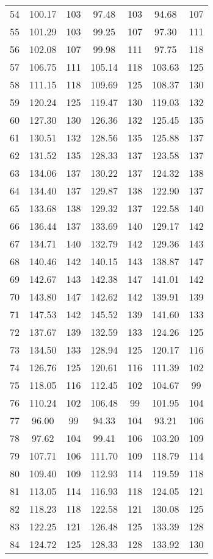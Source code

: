 \begin{center}
\begin{longtable}{lcccccc}
    54 &100.17&103& 97.48&103& 94.68&107 \\
    55 &101.29&103& 99.25&107& 97.30&111 \\
    56 &102.08&107& 99.98&111& 97.75&118 \\
    57 &106.75&111&105.14&118&103.63&125 \\
    58 &111.15&118&109.69&125&108.37&130 \\
    59 &120.24&125&119.47&130&119.03&132 \\
    60 &127.30&130&126.36&132&125.45&135 \\
    61 &130.51&132&128.56&135&125.88&137 \\
    62 &131.52&135&128.33&137&123.58&137 \\
    63 &134.06&137&130.22&137&124.32&138 \\
    64 &134.40&137&129.87&138&122.90&137 \\
    65 &133.68&138&129.32&137&122.58&140 \\
    66 &136.44&137&133.69&140&129.17&142 \\
    67 &134.71&140&132.79&142&129.36&143 \\
    68 &140.46&142&140.15&143&138.87&147 \\
    69 &142.67&143&142.38&147&141.01&142 \\
    70 &143.80&147&142.62&142&139.91&139 \\
    71 &147.53&142&145.52&139&141.60&133 \\
    72 &137.67&139&132.59&133&124.26&125 \\
    73 &134.50&133&128.94&125&120.17&116 \\
    74 &126.76&125&120.61&116&111.39&102 \\
    75 &118.05&116&112.45&102&104.67& 99 \\
    76 &110.24&102&106.48& 99&101.95&104 \\
    77 & 96.00& 99& 94.33&104& 93.21&106 \\
    78 & 97.62&104& 99.41&106&103.20&109 \\
    79 &107.71&106&111.70&109&118.79&114 \\
    80 &109.40&109&112.93&114&119.59&118 \\
    81 &113.05&114&116.93&118&124.05&121 \\
    82 &118.23&118&122.58&121&130.08&125 \\
    83 &122.25&121&126.48&125&133.39&128 \\
    84 &124.72&125&128.33&128&133.92&130 \\

\end{longtable}
\end{center}
